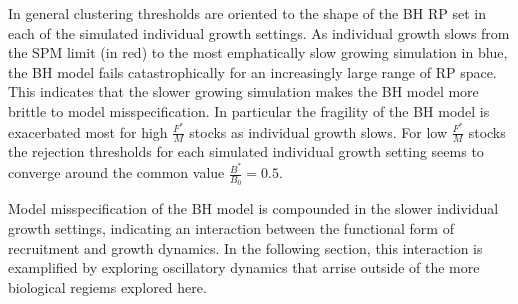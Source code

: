 
%
In general clustering thresholds are oriented to the shape of the BH RP set in each of the simulated individual 
growth settings. As individual growth slows from the SPM limit (in red) to the most emphatically slow growing 
simulation in blue, the BH model fails catastrophically for an increasingly large range of RP space. 
This indicates that the slower growing simulation makes the BH model more brittle to model misspecification. 
In particular the fragility of the BH model is exacerbated most for high $\frac{F^*}{M}$ stocks as individual growth slows. %
For low $\frac{F^*}{M}$ stocks the rejection thresholds for each simulated individual growth setting seems 
to converge around the common value $\frac{B^*}{B_0}=0.5$.


%
Model misspecification of the BH model is compounded in the slower individual 
growth settings, indicating an interaction between the functional form of 
recruitment and growth dynamics. In the following section, this interaction is 
examplified by exploring oscillatory dynamics that arrise outside of the more 
biological regiems explored here.



